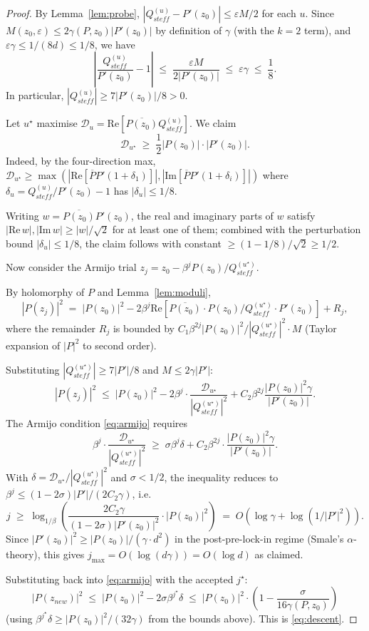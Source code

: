\documentclass[11pt,a4paper]{article}
\begin{document}
\begin{proof}
By Lemma~\ref{lem:probe}, $|Q_{steff}^{(u)} - P'(z_0)| \le \varepsilon M / 2$ for each $u$. Since $M(z_0, \varepsilon) \le 2 \gamma(P, z_0) |P'(z_0)|$ by definition of $\gamma$ (with the $k = 2$ term), and $\varepsilon \gamma \le 1/(8d) \le 1/8$, we have
$$ \left| \frac{Q_{steff}^{(u)}}{P'(z_0)} - 1 \right| \;\le\; \frac{\varepsilon M}{2 |P'(z_0)|} \;\le\; \varepsilon \gamma \;\le\; \frac{1}{8}. $$
In particular, $|Q_{steff}^{(u)}| \ge 7|P'(z_0)|/8 > 0$.

Let $u^\star$ maximise $\mathcal{D}_u = \mathrm{Re}[\overline{P(z_0)} Q_{steff}^{(u)}]$. We claim
$$ \mathcal{D}_{u^\star} \;\ge\; \frac{1}{2} |P(z_0)| \cdot |P'(z_0)|. $$
Indeed, by the four-direction max, $\mathcal{D}_{u^\star} \ge \max(|\mathrm{Re}[\overline{P} P'(1+\delta_1)]|, |\mathrm{Im}[\overline{P} P'(1+\delta_i)]|)$ where $\delta_u = Q_{steff}^{(u)}/P'(z_0) - 1$ has $|\delta_u| \le 1/8$.

Writing $w = \overline{P(z_0)} P'(z_0)$, the real and imaginary parts of $w$ satisfy $|\mathrm{Re}\, w|, |\mathrm{Im}\, w| \ge |w|/\sqrt 2$ for at least one of them; combined with the perturbation bound $|\delta_u| \le 1/8$, the claim follows with constant $\ge (1 - 1/8)/\sqrt{2} \ge 1/2$.

Now consider the Armijo trial $z_j = z_0 - \beta^j P(z_0)/Q_{steff}^{(u^\star)}$.

By holomorphy of $P$ and Lemma~\ref{lem:moduli},
$$ |P(z_j)|^2 \;=\; |P(z_0)|^2 - 2\beta^j \mathrm{Re}[\overline{P(z_0)} \cdot P(z_0)/Q_{steff}^{(u^\star)} \cdot P'(z_0)] + R_j, $$
where the remainder $R_j$ is bounded by $C_1 \beta^{2j} |P(z_0)|^2 / |Q_{steff}^{(u^\star)}|^2 \cdot M$ (Taylor expansion of $|P|^2$ to second order).

Substituting $|Q_{steff}^{(u^\star)}| \ge 7|P'|/8$ and $M \le 2\gamma |P'|$:
$$ |P(z_j)|^2 \;\le\; |P(z_0)|^2 - 2\beta^j \cdot \frac{\mathcal{D}_{u^\star}}{|Q_{steff}^{(u^\star)}|^2} + C_2 \beta^{2j} \frac{|P(z_0)|^2 \gamma}{|P'(z_0)|}. $$
The Armijo condition \eqref{eq:armijo} requires
$$ \beta^j \cdot \frac{\mathcal{D}_{u^\star}}{|Q_{steff}^{(u^\star)}|^2} \;\ge\; \sigma \beta^j \delta + C_2 \beta^{2j} \cdot \frac{|P(z_0)|^2 \gamma}{|P'(z_0)|}. $$
With $\delta = \mathcal{D}_{u^\star}/|Q_{steff}^{(u^\star)}|^2$ and $\sigma < 1/2$, the inequality reduces to $\beta^j \le (1 - 2\sigma) |P'|/(2 C_2 \gamma)$, i.e.
$$ j \;\ge\; \log_{1/\beta}\!\left( \frac{2 C_2 \gamma}{(1 - 2\sigma) |P'(z_0)|^2} \cdot |P(z_0)|^2 \right) \;=\; O(\log \gamma + \log(1/|P'|^2)). $$
Since $|P'(z_0)|^2 \ge |P(z_0)|/(\gamma \cdot d^2)$ in the post-pre-lock-in regime (Smale's $\alpha$-theory), this gives $j_{\max} = O(\log(d \gamma)) = O(\log d)$ as claimed.

Substituting back into \eqref{eq:armijo} with the accepted $j^\star$:
$$ |P(z_{new})|^2 \;\le\; |P(z_0)|^2 - 2 \sigma \beta^{j^\star} \delta \;\le\; |P(z_0)|^2 \cdot \left(1 - \frac{\sigma}{16 \gamma(P, z_0)}\right) $$
(using $\beta^{j^\star} \delta \ge |P(z_0)|^2/(32\gamma)$ from the bounds above). This is \eqref{eq:descent}.
\end{proof}
\end{document}
